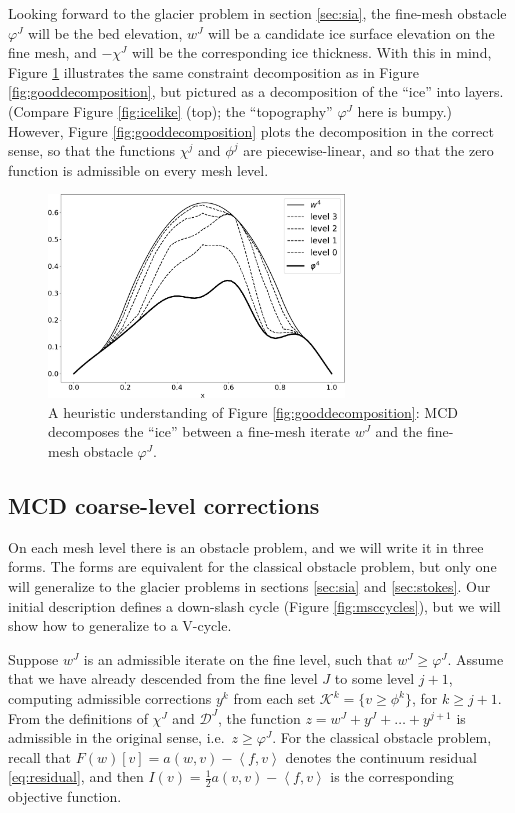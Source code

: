 \documentclass[letterpaper,final,12pt,reqno]{amsart}
\theoremstyle{claim}
\newcommand{\ip}[2]{\left<#1,#2\right>}
\numberwithin{equation}{section}
\numberwithin{figure}{section}
\numberwithin{table}{section}
\numberwithin{theorem}{section}
\begin{document}
Looking forward to the glacier problem in section \ref{sec:sia}, the fine-mesh obstacle $\varphi^J$ will be the bed elevation, $w^J$ will be a candidate ice surface elevation on the fine mesh, and $-\chi^J$ will be the corresponding ice thickness.  With this in mind, Figure \ref{fig:icelikedecomposition} illustrates the same constraint decomposition as in Figure \ref{fig:gooddecomposition}, but pictured as a decomposition of the ``ice'' into layers.  (Compare Figure \ref{fig:icelike} (top); the ``topography'' $\varphi^J$ here is bumpy.)  However, Figure \ref{fig:gooddecomposition} plots the decomposition in the correct sense, so that the functions $\chi^j$ and $\phi^j$ are piecewise-linear, and so that the zero function is admissible on every mesh level.

\begin{figure}
\includegraphics[width=0.7\textwidth]{fixfigs/icedec_defect.pdf}
\caption{A heuristic understanding of Figure \ref{fig:gooddecomposition}: MCD decomposes the ``ice'' between a fine-mesh iterate $w^J$ and the fine-mesh obstacle $\varphi^J$.}
\label{fig:icelikedecomposition}
\end{figure}

\subsection*{MCD coarse-level corrections}  On each mesh level there is an obstacle problem, and we will write it in three forms.  The forms are equivalent for the classical obstacle problem, but only one will generalize to the glacier problems in sections \ref{sec:sia} and \ref{sec:stokes}.  Our initial description defines a down-slash cycle (Figure \ref{fig:msccycles}), but we will show how to generalize to a V-cycle.

Suppose $w^J$ is an admissible iterate on the fine level, such that $w^J\ge \varphi^J$.  Assume that we have already descended from the fine level $J$ to some level $j+1$, computing admissible corrections $y^k$ from each set $\mathcal{K}^k=\{v\ge \phi^k\}$, for $k\ge j+1$.  From the definitions of $\chi^J$ and $\mathcal{D}^J$, the function $z = w^J+y^J+\dots+y^{j+1}$ is admissible in the original sense, i.e.~$z\ge \varphi^J$.  For the classical obstacle problem, recall that $F(w)[v] = a(w,v) - \ip{f}{v}$ denotes the continuum residual \eqref{eq:residual}, and then $I(v) = \frac{1}{2} a(v,v) - \ip{f}{v}$ is the corresponding objective function.
\end{document}
